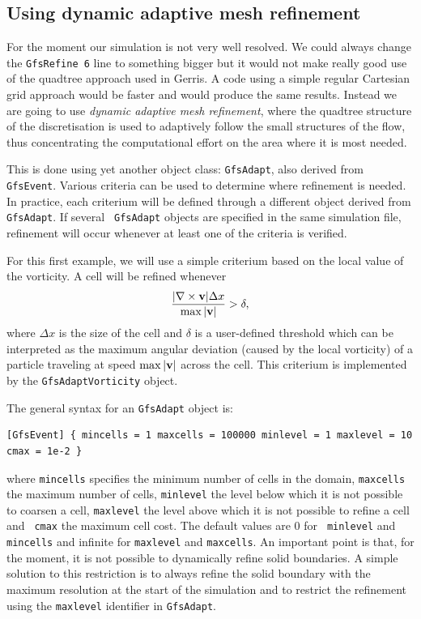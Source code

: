 \documentclass[a4paper]{article}
\begin{document}
\subsection{Using dynamic adaptive mesh refinement}

For the moment our simulation is not very well resolved. We could always 
change the {\tt GfsRefine 6} line to something bigger but it would not
make really good use of the quadtree approach used in Gerris. A code
using a simple regular Cartesian grid approach would be faster and
would produce the same results. Instead we are going to use {\em
dynamic adaptive mesh refinement}, where the quadtree structure of the 
discretisation is used to adaptively follow the small structures of
the flow, thus concentrating the computational effort on the area
where it is most needed. 

This is done using yet another object class: {\tt GfsAdapt}, also derived 
from {\tt GfsEvent}. Various criteria can be used to determine where
refinement is needed. In practice, each criterium will be defined
through a different object derived from {\tt GfsAdapt}. If several {\tt 
GfsAdapt} objects are specified in the same simulation file, refinement 
will occur whenever at least one of the criteria is verified.

For this first example, we will use a simple criterium based on the
local value of the vorticity. A cell will be refined whenever
$$
{|\nabla\times{\bf v}|\Delta x\over\max|{\bf v}|} > \delta,
$$
where $\Delta x$ is the size of the cell and $\delta$ is a
user-defined threshold which can be interpreted as the maximum angular 
deviation (caused by the local vorticity) of a particle traveling at 
speed $\max|{\bf v}|$ across the cell. This criterium is implemented
by the {\tt GfsAdaptVorticity} object.

The general syntax for an {\tt GfsAdapt} object is:
\begin{verbatim}
[GfsEvent] { mincells = 1 maxcells = 100000 minlevel = 1 maxlevel = 10 cmax = 1e-2 }
\end{verbatim}
where {\tt mincells} specifies the minimum number of cells in the
domain, {\tt maxcells} the maximum number of cells, {\tt minlevel} the
level below which it is not possible to coarsen a cell, {\tt maxlevel}
the level above which it is not possible to refine a cell and {\tt
  cmax} the maximum cell cost. The default values are 0 for {\tt
  minlevel} and {\tt mincells} and infinite for {\tt maxlevel} and
{\tt maxcells}. An important point is that, for the moment, it is not
possible to dynamically refine solid boundaries. A simple solution to
this restriction is to always refine the solid boundary with the
maximum resolution at the start of the simulation and to restrict the
refinement using the {\tt maxlevel} identifier in {\tt GfsAdapt}.
\end{document}

